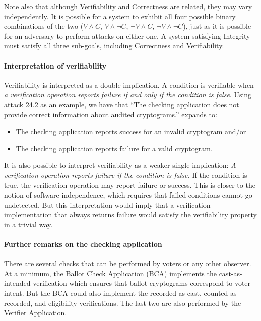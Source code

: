 \documentclass[10pt,letterpaper]{article}
\begin{document}
Note also that although Verifiability and Correctness are related, they may vary independently. It is possible for a system to exhibit all four possible binary combinations of the two ($V\wedge C$, $V\wedge\neg C$, $\neg V\wedge C$, $\neg V\wedge \neg C$), just as it is possible for an adversary to perform attacks on either one. A system satisfying Integrity must satisfy all three sub-goals, including Correctness and Verifiability.





\paragraph{Interpretation of verifiability}

Verifiability is interpreted as a double implication. A condition is verifiable when \emph{a verification operation reports failure if and only if the condition is false}. Using attack \hyperlink{ATK24.2}{24.2} as an example, we have that ``The checking application does not provide correct information about audited cryptograms.'' expands to:
%
\begin{itemize}
    \item The checking application reports success for an invalid cryptogram and/or
    \item The checking application reports failure for a valid cryptogram.
\end{itemize}

It is also possible to interpret verifiability as a weaker single implication: \emph{A verification operation reports failure if the condition is false.}
%
If the condition is true, the verification operation may report failure or success. This is closer to the notion of software independence, which requires that failed conditions cannot go undetected. But this interpretation would imply that a verification implementation that always returns failure would satisfy the verifiability property in a trivial way.

\hypertarget{further-remarks-checking-application}{\paragraph{Further remarks on the checking application}}
There are several checks that can be performed by voters or any other observer. At a minimum, the Ballot Check Application (BCA) implements the cast-as-intended verification which ensures that ballot cryptograms correspond to voter intent. But the BCA could also implement the recorded-as-cast, counted-as-recorded, and eligibility verifications. The last two are also performed by the Verifier Application.
\end{document}
